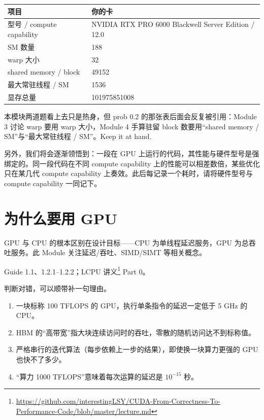 \documentclass[11pt,a4paper,fontset=none]{ctexart}
\begin{document}
\begin{answer}
\begin{center}\small
\begin{tabular}{@{}ll@{}}
\toprule
项目 & 你的卡 \\
\midrule
型号 / compute capability & NVIDIA RTX PRO 6000 Blackwell Server Edition / 12.0 \\
SM 数量 & 188 \\
warp 大小 & 32 \\
shared memory / block & 49152 \\
最大常驻线程 / SM & 1536 \\
显存总量 & 101975851008 \\
\bottomrule
\end{tabular}
\end{center}
\end{answer}

\begin{lookback}
本模块两道题看上去只是热身，但 prob 0.2 的那张表后面会反复被引用：Module 3 讨论 warp 要用 warp 大小，Module 4 手算驻留 block 数要用“shared memory / SM”与“最大常驻线程 / SM”。Keep it at hand.

另外，我们将会逐渐领悟到：一段在 GPU 上运行的代码，其性能与硬件型号是强绑定的。同一段代码在不同 compute capability 上的性能可以相差数倍，某些优化只在某几代 compute capability 上奏效。此后每记录一个耗时，请将硬件型号与 compute capability 一同记下。
\end{lookback}

\section{为什么要用 GPU}

GPU 与 CPU 的根本区别在设计目标——CPU 为单线程延迟服务，GPU 为总吞吐服务。此 Module 关注延迟/吞吐、SIMD/SIMT 等相关概念。

\begin{reading}
Guide 1.1、1.2.1--1.2.2；LCPU 讲义\footnote{\url{https://github.com/interestingLSY/CUDA-From-Correctness-To-Performance-Code/blob/master/lecture.md}} Part 0。
\end{reading}

判断对错，可以顺带补一句理由。
\begin{enumerate}[label=(\alph*)]
  \item 一块标称 100 TFLOPS 的 GPU，执行单条指令的延迟一定低于 5 GHz 的 CPU。
  \item HBM 的“高带宽”指大块连续访问时的吞吐，零散的随机访问达不到标称值。
  \item 严格串行的迭代算法（每步依赖上一步的结果），即使换一块算力更强的 GPU 也快不了多少。
  \item “算力 1000 TFLOPS”意味着每次运算的延迟是 $10^{-15}$ 秒。
\end{enumerate}
\end{document}
